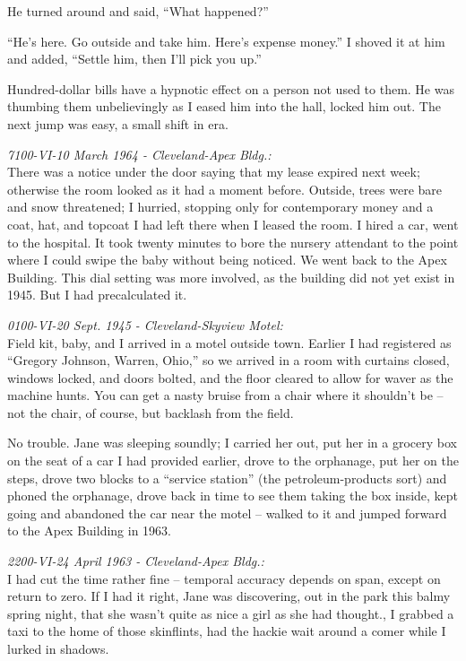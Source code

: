 He turned around and said, ``What happened?''

``He's  here.  Go  outside  and take him. Here's expense
money.'' I shoved it at him and added, ``Settle him, then  I'll
pick you up.''

Hundred-dollar bills have a hypnotic effect on a person
not used to them. He was thumbing them unbelievingly as I eased
him into the hall, locked him out. The next jump was easy, a
small shift in era.

\emph{7100-VI-10 March 1964 - Cleveland-Apex Bldg.:}\\
There was a notice under the door saying that my lease expired next week;
otherwise the room looked as it had a moment  before. Outside,
trees  were  bare and snow threatened; I hurried, stopping only
for contemporary money and a coat, hat, and topcoat I had  left
there  when  I  leased  the  room.  I  hired a car, went to the
hospital. It took twenty minutes to bore the nursery  attendant
to  the  point  where  I  could  swipe  the  baby without being
noticed. We went back to the Apex Building. This  dial  setting
was  more  involved, as the building did not yet exist in 1945.
But I had precalculated it.

\emph{0100-VI-20 Sept. 1945 - Cleveland-Skyview Motel:}\\
Field kit, baby, and I arrived in a motel outside town. Earlier I had
registered as ``Gregory Johnson, Warren, Ohio,'' so  we  arrived
in  a  room  with  curtains  closed,  windows locked, and doors
bolted, and the floor cleared to allow for waver as the machine
hunts. You can get  a  nasty  bruise  from  a  chair  where  it
shouldn't  be -- not the chair, of course, but backlash from the
field.

No trouble. Jane was sleeping soundly;  I  carried  her
out,  put  her  in  a  grocery  box  on the seat of a car I had
provided earlier, drove to the orphanage, put her on the steps,
drove two blocks to a ``service station'' (the petroleum-products
sort) and phoned the orphanage, drove back in time to see  them
taking  the  box  inside, kept going and abandoned the car near
the motel -- walked  to  it  and  jumped  forward  to  the  Apex
Building in 1963.

\emph{2200-VI-24 April 1963 - Cleveland-Apex Bldg.:}\\
I had cut the time  rather  fine  -- temporal  accuracy  depends on span,
except on  return  to  zero.  If  I  had  it  right,  Jane  was
discovering,  out in the park this balmy spring night, that she
wasn't quite as nice a girl as she had thought.,  I  grabbed  a
taxi  to  the  home  of  those  skinflints, had the hackie wait
around a comer while I lurked in shadows.

